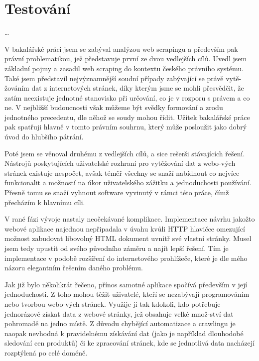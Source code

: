 \documentclass[thesis=B,czech]{FITthesis}[2012/06/26]
\begin{document}

\chapter{Testování}
\dots


\begin{conclusion}
	V bakalářské práci jsem se zabýval analýzou web scrapingu a především pak právní problematikou, jež představuje první ze dvou vedlejších cílů. Uvedl jsem základní pojmy a zasadil web scraping do kontextu českého právního systému. Také jsem představil nejvýznamnější soudní případy zabývající se právě vytě-žováním dat z internetových stránek, díky kterým jsme se mohli přesvědčit, že zatím neexistuje jednotné stanovisko při určování, co je v rozporu s právem a co ne. V nejbližší budoucnosti však můžeme být svědky formování a zrodu jednotného precedentu, dle něhož se soudy mohou řídit. Užitek bakalářské práce pak spatřuji hlavně v tomto právním souhrnu, který může posloužit jako dobrý úvod do hlubšího pátrání.
	
	Poté jsem se věnoval druhému z vedlejších cílů, a sice rešerši stávajících řešení. Nástrojů poskytujících uživatelské rozhraní pro vytěžování dat z webo-vých stránek existuje nespočet, avšak téměř všechny se snaží nabídnout co nejvíce funkcionalit a možností na úkor uživatelského zážitku a jednoduchosti používání. Přesně tomu se snaží vyhnout software vyvinutý v rámci této práce, čímž přecházím k hlavnímu cíli.
	
	V rané fázi vývoje nastaly neočekávané komplikace. Implementace návrhu jakožto webové aplikace najednou nepřipadala v úvahu kvůli HTTP hlavičce omezující možnost zabudovat libovolný HTML dokument uvnitř své vlastní stránky. Musel jsem tedy upustit od svého původního záměru a najít lepší řešení. Tím je implementace v podobě rozšíření do internetového prohlížeče, které je dle mého názoru elegantním řešením daného problému.
	
	Jak již bylo několikrát řečeno, přínos samotné aplikace spočívá především v její jednoduchosti. Z toho mohou těžit uživatelé, kteří se nezabývají programováním nebo tvorbou webo-vých stránek. Využije ji tak kdokoli, kdo potřebuje jednorázově získat data z webové stránky, jež obsahuje velké množ-ství dat pohromadě na jedno místě. Z důvodu chybějící automatizace a crawlingu je naopak nevhodná k pravidelnému získávání dat (jako je například dlouhodobé sledování cen produktů) či ke zpracování stránek, kde se jednotlivá data nacházejí rozptýlená po celé doméně.
	

\end{conclusion}
\end{document}
